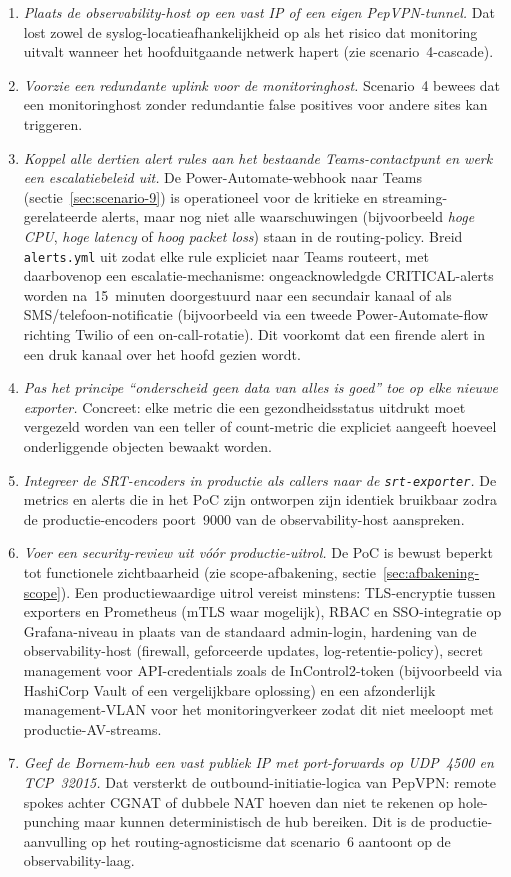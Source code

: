 \begin{enumerate}
  \item \emph{Plaats de observability-host op een vast IP of een eigen PepVPN-tunnel.} Dat lost zowel de syslog-locatieafhankelijkheid op als het risico dat monitoring uitvalt wanneer het hoofduitgaande netwerk hapert (zie scenario~4-cascade).
  \item \emph{Voorzie een redundante uplink voor de monitoringhost.} Scenario~4 bewees dat een monitoringhost zonder redundantie false positives voor andere sites kan triggeren.
  \item \emph{Koppel alle dertien alert rules aan het bestaande Teams-contactpunt en werk een escalatiebeleid uit.} De Power-Automate-webhook naar Teams (sectie~\ref{sec:scenario-9}) is operationeel voor de kritieke en streaming-gerelateerde alerts, maar nog niet alle waarschuwingen (bijvoorbeeld \emph{hoge CPU}, \emph{hoge latency} of \emph{hoog packet loss}) staan in de routing-policy. Breid \texttt{alerts.yml} uit zodat elke rule expliciet naar Teams routeert, met daarbovenop een escalatie-mechanisme: ongeacknowledgde CRITICAL-alerts worden na~15~minuten doorgestuurd naar een secundair kanaal of als SMS/telefoon-notificatie (bijvoorbeeld via een tweede Power-Automate-flow richting Twilio of een on-call-rotatie). Dit voorkomt dat een firende alert in een druk kanaal over het hoofd gezien wordt.
  \item \emph{Pas het principe ``onderscheid geen data van alles is goed'' toe op elke nieuwe exporter.} Concreet: elke metric die een gezondheidsstatus uitdrukt moet vergezeld worden van een teller of count-metric die expliciet aangeeft hoeveel onderliggende objecten bewaakt worden.
  \item \emph{Integreer de SRT-encoders in productie als callers naar de \texttt{srt-exporter}.} De metrics en alerts die in het PoC zijn ontworpen zijn identiek bruikbaar zodra de productie-encoders poort~9000 van de observability-host aanspreken.
  \item \emph{Voer een security-review uit vóór productie-uitrol.} De PoC is bewust beperkt tot functionele zichtbaarheid (zie scope-afbakening, sectie~\ref{sec:afbakening-scope}). Een productiewaardige uitrol vereist minstens: TLS-encryptie tussen exporters en Prometheus (mTLS waar mogelijk), RBAC en SSO-integratie op Grafana-niveau in plaats van de standaard admin-login, hardening van de observability-host (firewall, geforceerde updates, log-retentie-policy), secret management voor API-credentials zoals de InControl2-token (bijvoorbeeld via HashiCorp Vault of een vergelijkbare oplossing) en een afzonderlijk management-VLAN voor het monitoringverkeer zodat dit niet meeloopt met productie-AV-streams.
  \item \emph{Geef de Bornem-hub een vast publiek IP met port-forwards op UDP~4500 en TCP~32015.} Dat versterkt de outbound-initiatie-logica van PepVPN: remote spokes achter CGNAT of dubbele NAT hoeven dan niet te rekenen op hole-punching maar kunnen deterministisch de hub bereiken. Dit is de productie-aanvulling op het routing-agnosticisme dat scenario~6 aantoont op de observability-laag.
\end{enumerate}

